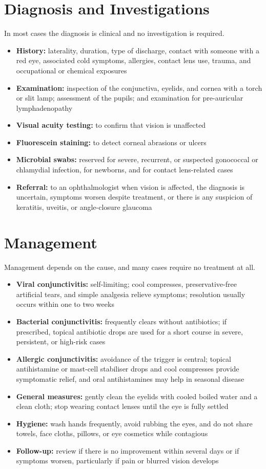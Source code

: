 \section*{Diagnosis and Investigations}
\medskip
\noindent In most cases the diagnosis is clinical and no investigation is required.
\begin{itemize}
    \item \textbf{History:} laterality, duration, type of discharge, contact with someone with a red eye, associated cold symptoms, allergies, contact lens use, trauma, and occupational or chemical exposures
    \item \textbf{Examination:} inspection of the conjunctiva, eyelids, and cornea with a torch or slit lamp; assessment of the pupils; and examination for pre-auricular lymphadenopathy
    \item \textbf{Visual acuity testing:} to confirm that vision is unaffected
    \item \textbf{Fluorescein staining:} to detect corneal abrasions or ulcers
    \item \textbf{Microbial swabs:} reserved for severe, recurrent, or suspected gonococcal or chlamydial infection, for newborns, and for contact lens-related cases
    \item \textbf{Referral:} to an ophthalmologist when vision is affected, the diagnosis is uncertain, symptoms worsen despite treatment, or there is any suspicion of keratitis, uveitis, or angle-closure glaucoma
\end{itemize}

\section*{Management}
\medskip
\noindent Management depends on the cause, and many cases require no treatment at all.
\begin{itemize}
    \item \textbf{Viral conjunctivitis:} self-limiting; cool compresses, preservative-free artificial tears, and simple analgesia relieve symptoms; resolution usually occurs within one to two weeks
    \item \textbf{Bacterial conjunctivitis:} frequently clears without antibiotics; if prescribed, topical antibiotic drops are used for a short course in severe, persistent, or high-risk cases
    \item \textbf{Allergic conjunctivitis:} avoidance of the trigger is central; topical antihistamine or mast-cell stabiliser drops and cool compresses provide symptomatic relief, and oral antihistamines may help in seasonal disease
    \item \textbf{General measures:} gently clean the eyelids with cooled boiled water and a clean cloth; stop wearing contact lenses until the eye is fully settled
    \item \textbf{Hygiene:} wash hands frequently, avoid rubbing the eyes, and do not share towels, face cloths, pillows, or eye cosmetics while contagious
    \item \textbf{Follow-up:} review if there is no improvement within several days or if symptoms worsen, particularly if pain or blurred vision develops
\end{itemize}


